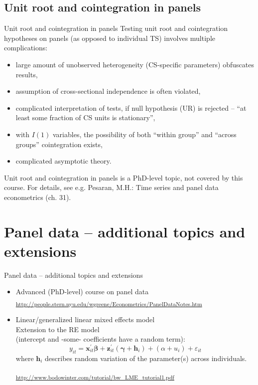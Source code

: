 \documentclass[usenames,dvipsnames]{beamer}
\begin{document}
\subsection*{Unit root and cointegration in panels}
\begin{frame}{Unit root and cointegration in panels}
\footnotesize
Testing unit root and cointegration hypotheses on panels (as opposed to individual TS) involves multiple complications:\\
\medskip
    \begin{itemize}
        \item large amount of unobserved heterogeneity (CS-specific parameters) obfuscates results,
        \item assumption of cross-sectional independence is often violated,
        \item complicated interpretation of tests, if null hypothesis (UR) is rejected -- ``at least some fraction of CS units is stationary'',
        \item with $I(1)$ variables, the possibility of both ``within group'' and ``across groups'' cointegration exists,
        \item complicated asymptotic theory.
    \end{itemize}
    \bigskip
    Unit root and cointegration in panels is a PhD-level topic, not covered by this course. For details, see e.g. Pesaran, M.H.: Time series and panel data econometrics (ch. 31).
\end{frame}
\section{Panel data -- additional topics and extensions}
\begin{frame}{Panel data -- additional topics and extensions}
\begin{itemize}
\item Advanced (PhD-level) course on panel data \\
\textsubscript{\textcolor{Blue}{\url{http://people.stern.nyu.edu/wgreene/Econometrics/PanelDataNotes.htm}} }
\bigskip
\item Linear/generalized linear mixed effects model \\
Extension to the RE model \\(intercept and -some- coefficients have a random term):
$$
y_{it}=\bm{x}_{it}^{\prime} \bm{\beta} + \bm{z}_{it}^{\prime}( \bm{\gamma} + \bm{h}_i) +
(\alpha + u_i) + \varepsilon_{it}
$$
where $\bm{h}_i$ describes random variation of the parameter(s) across individuals.\\
\medskip

\textsubscript{ \textcolor{Blue}{\url{http://www.bodowinter.com/tutorial/bw_LME_tutorial1.pdf}} } \\
\end{itemize}
\end{frame}
\end{document}
